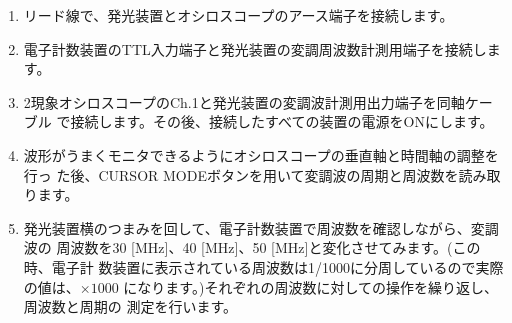\bigskip


\begin{enumerate}

\item リード線で、発光装置とオシロスコープのアース端子を接続します。

\item 電子計数装置のTTL入力端子と発光装置の変調周波数計測用端子を接続します。

\item 2現象オシロスコープのCh.1と発光装置の変調波計測用出力端子を同軸ケーブル 
で接続します。その後、接続したすべての装置の電源をONにします。

\item 波形がうまくモニタできるようにオシロスコープの垂直軸と時間軸の調整を行っ 
た後、CURSOR MODEボタンを用いて変調波の周期と周波数を読み取ります。

\item  発光装置横のつまみを回して、電子計数装置で周波数を確認しながら、変調波の
周波数を30 [MHz]、40 [MHz]、50 [MHz]と変化させてみます。(この時、電子計
数装置に表示されている周波数は1/1000に分周しているので実際の値は、$\times 1000$
になります。)それぞれの周波数に対しての操作を繰り返し、周波数と周期の 
測定を行います。

\end{enumerate}


